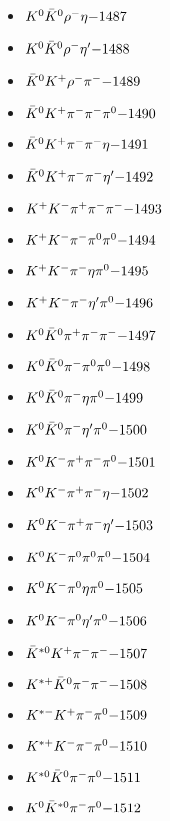 \begin{multicols}{3}
\begin{itemize}
 \item $ K^{0} \bar{K}^{0} \rho^{-} \eta \hfill{-1487}$
 \item $ K^{0} \bar{K}^{0} \rho^{-} {\eta^{\prime}} \hfill{-1488}$
 \item $ \bar{K}^{0} K^{+} \rho^{-} \pi^{-} \hfill{-1489}$
 \item $ \bar{K}^{0} K^{+} \pi^{-} \pi^{-} \pi^{0} \hfill{-1490}$
 \item $ \bar{K}^{0} K^{+} \pi^{-} \pi^{-} \eta \hfill{-1491}$
 \item $ \bar{K}^{0} K^{+} \pi^{-} \pi^{-} {\eta^{\prime}} \hfill{-1492}$
 \item $ K^{+} K^{-} \pi^{+} \pi^{-} \pi^{-} \hfill{-1493}$
 \item $ K^{+} K^{-} \pi^{-} \pi^{0} \pi^{0} \hfill{-1494}$
 \item $ K^{+} K^{-} \pi^{-} \eta \pi^{0} \hfill{-1495}$
 \item $ K^{+} K^{-} \pi^{-} {\eta^{\prime}} \pi^{0} \hfill{-1496}$
 \item $ K^{0} \bar{K}^{0} \pi^{+} \pi^{-} \pi^{-} \hfill{-1497}$
 \item $ K^{0} \bar{K}^{0} \pi^{-} \pi^{0} \pi^{0} \hfill{-1498}$
 \item $ K^{0} \bar{K}^{0} \pi^{-} \eta \pi^{0} \hfill{-1499}$
 \item $ K^{0} \bar{K}^{0} \pi^{-} {\eta^{\prime}} \pi^{0} \hfill{-1500}$
 \item $ K^{0} K^{-} \pi^{+} \pi^{-} \pi^{0} \hfill{-1501}$
 \item $ K^{0} K^{-} \pi^{+} \pi^{-} \eta \hfill{-1502}$
 \item $ K^{0} K^{-} \pi^{+} \pi^{-} {\eta^{\prime}} \hfill{-1503}$
 \item $ K^{0} K^{-} \pi^{0} \pi^{0} \pi^{0} \hfill{-1504}$
 \item $ K^{0} K^{-} \pi^{0} \eta \pi^{0} \hfill{-1505}$
 \item $ K^{0} K^{-} \pi^{0} {\eta^{\prime}} \pi^{0} \hfill{-1506}$
 \item $ \bar{K}^{*0} K^{+} \pi^{-} \pi^{-} \hfill{-1507}$
 \item $ K^{*+} \bar{K}^{0} \pi^{-} \pi^{-} \hfill{-1508}$
 \item $ K^{*-} K^{+} \pi^{-} \pi^{0} \hfill{-1509}$
 \item $ K^{*+} K^{-} \pi^{-} \pi^{0} \hfill{-1510}$
 \item $ K^{*0} \bar{K}^{0} \pi^{-} \pi^{0} \hfill{-1511}$
 \item $ K^{0} \bar{K}^{*0} \pi^{-} \pi^{0} \hfill{-1512}$

\end{itemize}
\end{multicols}
